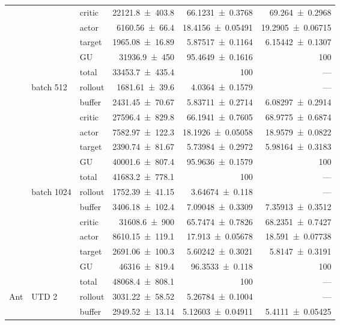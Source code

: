 {\begin{longtable}{@{}lllrrr@{}}
     &  & critic & \num{22121.8+-403.8} & \num{66.1231+-0.3768} & \num{69.264+-0.2968} \\
     &  & actor & \num{6160.56+-66.4} & \num{18.4156+-0.05491} & \num{19.2905+-0.06715} \\
     &  & target & \num{1965.08+-16.89} & \num{5.87517+-0.1164} & \num{6.15442+-0.1307} \\
     &  & GU & \num{31936.9+-450} & \num{95.4649+-0.1616} & 100 \\
     &  & total & \num{33453.7+-435.4} & \num{100} & --- \\
    \addlinespace[2pt]
     & batch 512 & rollout & \num{1681.61+-39.6} & \num{4.0364+-0.1579} & --- \\
     &  & buffer & \num{2431.45+-70.67} & \num{5.83711+-0.2714} & \num{6.08297+-0.2914} \\
     &  & critic & \num{27596.4+-829.8} & \num{66.1941+-0.7605} & \num{68.9775+-0.6874} \\
     &  & actor & \num{7582.97+-122.3} & \num{18.1926+-0.05058} & \num{18.9579+-0.0822} \\
     &  & target & \num{2390.74+-81.67} & \num{5.73984+-0.2972} & \num{5.98164+-0.3183} \\
     &  & GU & \num{40001.6+-807.4} & \num{95.9636+-0.1579} & 100 \\
     &  & total & \num{41683.2+-778.1} & \num{100} & --- \\
    \addlinespace[2pt]
     & batch 1024 & rollout & \num{1752.39+-41.15} & \num{3.64674+-0.118} & --- \\
     &  & buffer & \num{3406.18+-102.4} & \num{7.09048+-0.3309} & \num{7.35913+-0.3512} \\
     &  & critic & \num{31608.6+-900} & \num{65.7474+-0.7826} & \num{68.2351+-0.7427} \\
     &  & actor & \num{8610.15+-119.1} & \num{17.913+-0.05678} & \num{18.591+-0.07738} \\
     &  & target & \num{2691.06+-100.3} & \num{5.60242+-0.3021} & \num{5.8147+-0.3191} \\
     &  & GU & \num{46316+-819.4} & \num{96.3533+-0.118} & 100 \\
     &  & total & \num{48068.4+-808.1} & \num{100} & --- \\
    \addlinespace[2pt]
    \midrule
    Ant & UTD 2 & rollout & \num{3031.22+-58.52} & \num{5.26784+-0.1004} & --- \\
     &  & buffer & \num{2949.52+-13.14} & \num{5.12603+-0.04911} & \num{5.4111+-0.05425} \\

\end{longtable}}
